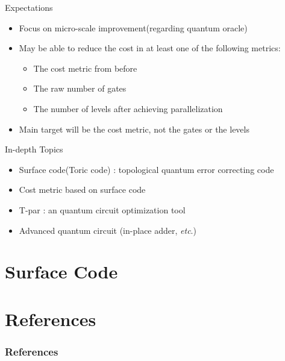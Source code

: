 \documentclass{beamer}
\begin{document}
    \begin{frame}{Expectations}
      \begin{itemize}
        \item Focus on micro-scale improvement(regarding quantum oracle)
        \item May be able to reduce the cost in at least one of the following metrics:
          \begin{itemize}
            \item The cost metric from before
            \item The raw number of gates
            \item The number of levels after achieving parallelization
          \end{itemize}
        \item Main target will be the cost metric, not the gates or the levels
      \end{itemize}
    \end{frame}
    
    \begin{frame}{In-depth Topics}
        \begin{itemize}
            \item Surface code(Toric code) : topological quantum error correcting code
            \item Cost metric based on surface code
            \item T-par \cite{amy2014polynomial} : an quantum circuit optimization tool
            \item Advanced quantum circuit (in-place adder, \textit{etc}.)
        \end{itemize}
    \end{frame}
    
    \section{Surface Code}
    
    
    \section{References}
    \begin{frame}[allowframebreaks]
        \frametitle{References}
        
        
    \end{frame}
    
\end{document}
